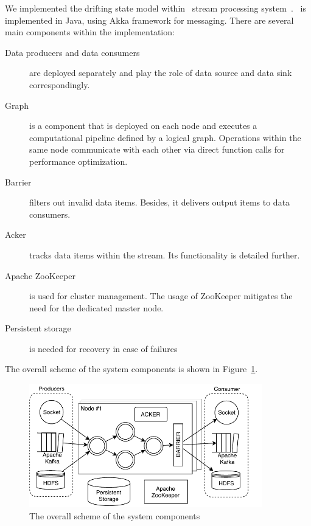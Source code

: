 
We implemented the drifting state model within \FlameStream\ stream processing system~\cite{we2018beyondmr}. \FlameStream\ is implemented in Java, using Akka framework for messaging. There are several main components within the implementation:
\begin{description}
  \item[Data producers and data consumers] are deployed separately and play the role of data source and data sink correspondingly.

  \item[Graph] is a component that is deployed on each node and executes a computational pipeline defined by a logical graph. Operations within the same node communicate with each other via direct function calls for performance optimization.

  \item[Barrier] filters out invalid data items. Besides, it delivers output items to data consumers.

  \item[Acker] tracks data items within the stream. Its functionality is detailed further.

  \item[Apache ZooKeeper] is used for cluster management. The usage of ZooKeeper mitigates the need for the dedicated master node.

  \item[Persistent storage] is needed for recovery in case of failures
\end{description}

The overall scheme of the system components is shown in Figure~\ref{system-architecture}.

\begin{figure}[t]
  \centering
  \includegraphics[width=0.9\textwidth]{Chapters/DeterministicModelRuntime/pics/arch.pdf}
  \caption{The overall scheme of the system components}
  \label {system-architecture}
\end{figure}

